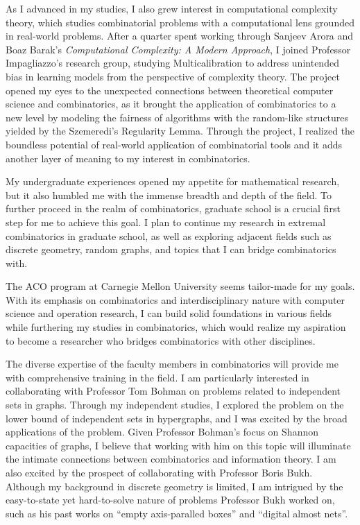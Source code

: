 \documentclass[12pt]{article}
\begin{document}
As I advanced in my studies, I also grew interest in computational complexity theory, which studies
combinatorial problems with a computational lens grounded in real-world problems. After a quarter
spent working through Sanjeev Arora and Boaz Barak's \textit{Computational Complexity: A Modern
Approach}, I joined Professor Impagliazzo's research group, studying Multicalibration to address
unintended bias in learning models from the perspective of complexity theory. The project opened my
eyes to the unexpected connections between theoretical computer science and combinatorics, as it
brought the application of combinatorics to a new level by modeling the fairness of algorithms with
the random-like structures yielded by the Szemeredi's Regularity Lemma. Through the project, I
realized the boundless potential of real-world application of combinatorial tools and it adds
another layer of meaning to my interest in combinatorics.

My undergraduate experiences opened my appetite for mathematical research, but it also humbled me
with the immense breadth and depth of the field. To further proceed in the realm of combinatorics,
graduate school is a crucial first step for me to achieve this goal. I plan to continue my research
in extremal combinatorics in graduate school, as well as exploring adjacent fields such as discrete
geometry, random graphs, and topics that I can bridge combinatorics with.

The ACO program at Carnegie Mellon University seems tailor-made for my goals. With its emphasis on
combinatorics and interdisciplinary nature with computer science and operation research, I can build
solid foundations in various fields while furthering my studies in combinatorics, which would
realize my aspiration to become a researcher who bridges combinatorics with other disciplines. 

The diverse expertise of the faculty members in combinatorics will provide me with comprehensive
training in the field. I am particularly interested in collaborating with Professor Tom Bohman on
problems related to independent sets in graphs. Through my independent studies, I explored the
problem on the lower bound of independent sets in hypergraphs, and I was excited by the broad
applications of the problem. Given Professor Bohman's focus on Shannon capacities of graphs, I
believe that working with him on this topic will illuminate the intimate connections between
combinatorics and information theory. I am also excited by the prospect of collaborating with
Professor Boris Bukh. Although my background in discrete geometry is limited, I am intrigued by the
easy-to-state yet hard-to-solve nature of problems Professor Bukh worked on, such as his past works
on ``empty axis-paralled boxes'' and ``digital almost nets''. 
\end{document}
